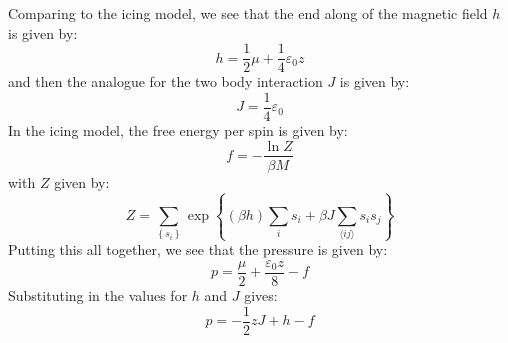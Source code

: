 \documentclass[12pt]{article}
\begin{document}
Comparing to the icing model, we see that the end along of the magnetic field $h$ is given by:
\begin{equation}
h = \frac{1}{2} \mu + \frac{1}{4} \varepsilon_{0} z
\end{equation}
and then the analogue for the two body interaction $J$ is given by:
\begin{equation}
J = \frac{1}{4} \varepsilon_{0}
\end{equation}
In the icing model, the free energy per spin is given by:
\begin{equation}
f = - \frac{\ln Z}{\beta M}
\end{equation}
with $Z$ given by:
\begin{equation}
Z = \sum_{\left\{s_{i}\right\}} \exp \left\{ \left( \beta h \right) \sum_{i} s_{i} + \beta J \sum_{\langle i j\rangle} s_{i} s_{j}\right\}
\end{equation}
Putting this all together, we see that the pressure is given by:
\begin{equation}
p = \frac{\mu  }{2}+ \frac{\varepsilon _{0}z}{8}-f
\end{equation}
Substituting in the values for $h$ and $J$ gives:
\begin{equation}
p = -\frac{1}{2} z J+h-f
\end{equation}
\subsection{}
\end{document}
